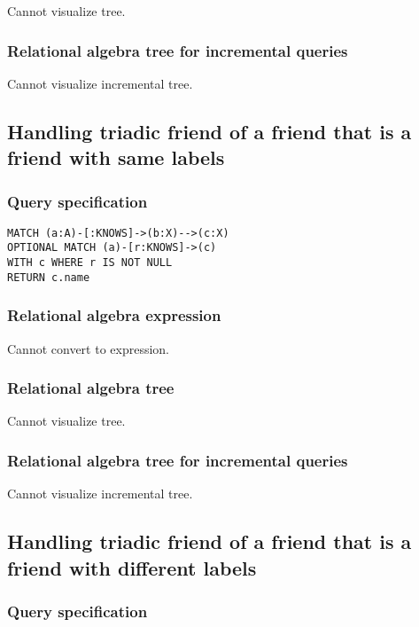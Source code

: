 Cannot visualize tree.

\subsubsection*{Relational algebra tree for incremental queries}

Cannot visualize incremental tree.

\subsection{Handling triadic friend of a friend that is a friend with same labels}

\subsubsection*{Query specification}

\begin{lstlisting}
MATCH (a:A)-[:KNOWS]->(b:X)-->(c:X)
OPTIONAL MATCH (a)-[r:KNOWS]->(c)
WITH c WHERE r IS NOT NULL
RETURN c.name
\end{lstlisting}

\subsubsection*{Relational algebra expression}

Cannot convert to expression.

\subsubsection*{Relational algebra tree}

Cannot visualize tree.

\subsubsection*{Relational algebra tree for incremental queries}

Cannot visualize incremental tree.

\subsection{Handling triadic friend of a friend that is a friend with different labels}

\subsubsection*{Query specification}


